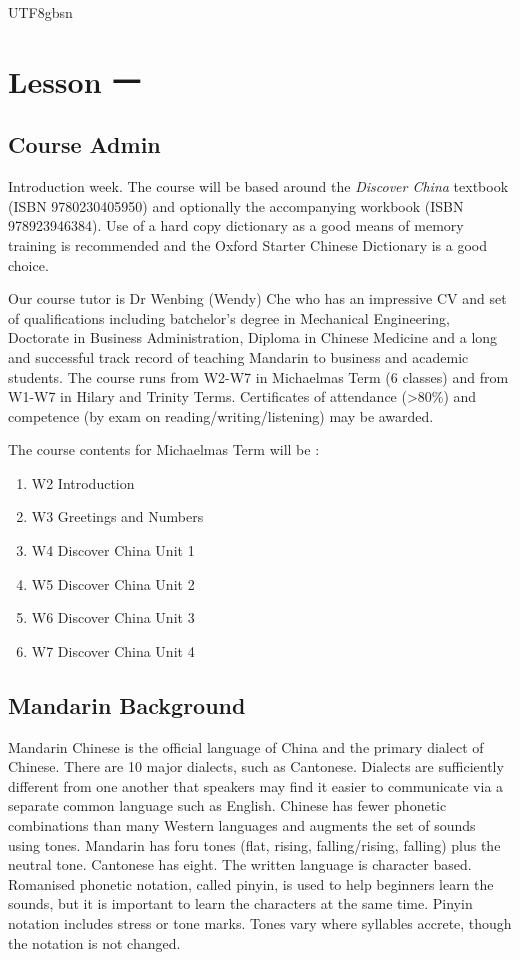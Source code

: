 \documentclass{article}
\newcommand{\myfont}{gbsn} %
\begin{document}
 
\begin{CJK}{UTF8}{\myfont} 
\section{Lesson 一}

\subsection{Course Admin}

Introduction week.   The course will be based around the {\it Discover China} textbook (ISBN 9780230405950) and optionally the accompanying workbook (ISBN 978923946384).  Use of a hard copy dictionary as a good means of memory training is recommended and the Oxford Starter Chinese Dictionary is a good choice.

Our course tutor is Dr Wenbing (Wendy) Che who has an impressive CV and set of qualifications including batchelor's degree in Mechanical Engineering, Doctorate in Business Administration, Diploma in Chinese Medicine and a long and successful track record of teaching Mandarin to business and academic students.    The course runs from W2-W7 in Michaelmas Term (6 classes) and from W1-W7 in Hilary and Trinity Terms.  Certificates of attendance (>80\%) and competence (by exam on reading/writing/listening) may be awarded.

The course contents for Michaelmas Term will be :

\begin{enumerate}
\item W2 Introduction
\item W3 Greetings and Numbers
\item W4 Discover China Unit 1
\item W5 Discover China Unit 2
\item W6 Discover China Unit 3
\item W7 Discover China Unit 4
\end{enumerate}

\subsection{Mandarin Background}

Mandarin Chinese is the official language of China and the primary dialect of Chinese.  There are 10 major dialects, such as Cantonese.  Dialects are sufficiently different from one another that speakers may find it easier to communicate via a separate common language such as English.   Chinese has fewer phonetic combinations than many Western languages and augments the set of sounds using tones.   Mandarin has foru tones (flat, rising, falling/rising, falling) plus the neutral tone.   Cantonese has eight.   The written language is character based.  Romanised phonetic notation, called pinyin, is used to help beginners learn the sounds, but it is important to learn the characters at the same time.  Pinyin notation includes stress or tone marks.   Tones vary where syllables accrete, though the notation is not changed.


\end{CJK}
\end{document}
